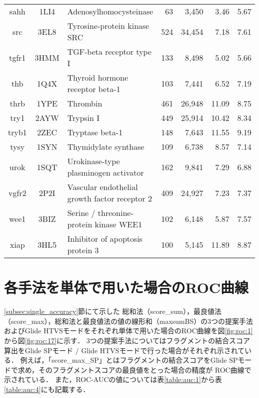 \begin{table}[t]
\begin{tabular}{c|c|p{6cm}|rr|rr}
sahh&1LI4&Adenosylhomocysteinase&63&3,450&3.46&5.67 \\
src&3EL8&Tyrosine-protein kinase SRC&524&34,454&7.18&7.61 \\
tgfr1&3HMM&TGF-beta receptor type I&133&8,498&5.02&5.66 \\
thb&1Q4X&Thyroid hormone receptor beta-1&103&7,441&6.52&7.19 \\
thrb&1YPE&Thrombin&461&26,948&11.09&8.75 \\
try1&2AYW&Trypsin I&449&25,914&10.42&8.34 \\
tryb1&2ZEC&Tryptase beta-1&148&7,643&11.55&9.19 \\
tysy&1SYN&Thymidylate synthase&109&6,738&8.57&7.14 \\
urok&1SQT&Urokinase-type plasminogen activator&162&9,841&7.29&6.88 \\
vgfr2&2P2I&Vascular endothelial growth factor receptor 2&409&24,927&7.23&7.37 \\
wee1&3BIZ&Serine / threonine-protein kinase WEE1&102&6,148&5.87&7.57 \\
xiap&3HL5&Inhibitor of apoptosis protein 3&100&5,145&11.89&8.87 \\ \hline
	\end{tabular}
\end{table}

\chapter{各手法を単体で用いた場合のROC曲線}\label{appendix:roc}
\ref{subsec:single_accuracy}節にて示した
総和法（score\_sum），最良値法（score\_max），総和法と最良値法の値の線形和（maxsumBS）の3つの提案手法
およびGlide HTVSモードをそれぞれ単体で用いた場合のROC曲線を図\ref{fig:roc:1}から図\ref{fig:roc:17}に示す．
3つの提案手法についてはフラグメントの結合スコア算出をGlide SPモード / Glide HTVSモードで行った場合がそれぞれ示されている．
例えば，「score\_max\_SP」とはフラグメントの結合スコアをGlide SPモードで求め，そのフラグメントスコアの最良値をとった場合の精度が
ROC曲線で示されている．
また，ROC-AUCの値については表\ref{table:auc:1}から表\ref{table:auc:4}にも記載する．



